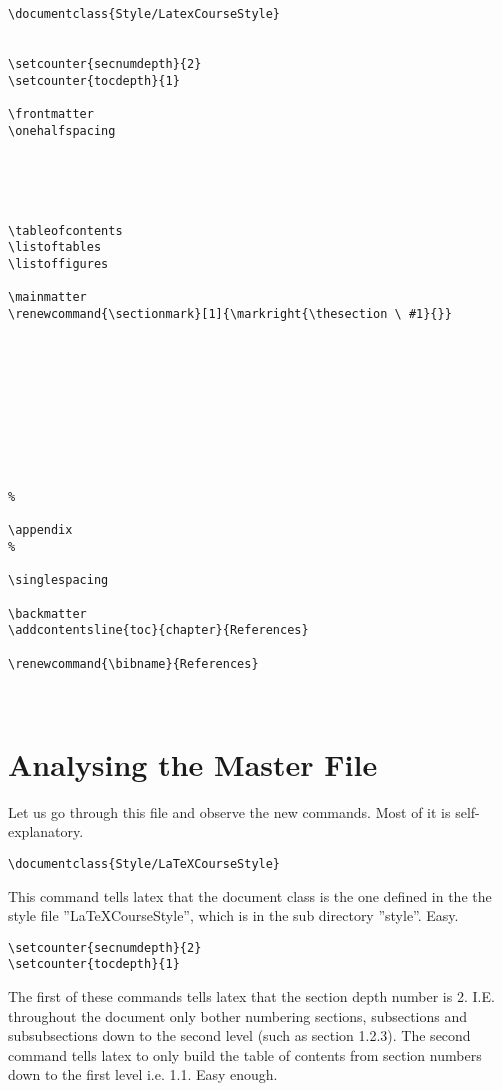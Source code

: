 \singlespacing
\pagebreak
\begin{verbatim}
\documentclass{Style/LatexCourseStyle}


\setcounter{secnumdepth}{2}
\setcounter{tocdepth}{1}

\frontmatter
\onehalfspacing





\tableofcontents
\listoftables
\listoffigures

\mainmatter
\renewcommand{\sectionmark}[1]{\markright{\thesection \ #1}{}}










%

\appendix
%

\singlespacing

\backmatter
\addcontentsline{toc}{chapter}{References}

\renewcommand{\bibname}{References}



\end{verbatim}
\onehalfspacing
\pagebreak

\section{Analysing the Master File}
Let us go through this file and observe the new commands. Most of it is self-explanatory.

\begin{verbatim}
\documentclass{Style/LaTeXCourseStyle}
\end{verbatim}

This command tells latex that the document class is the one defined in the the style file ''LaTeXCourseStyle'', which is in the sub directory ''style''.  Easy.

\begin{verbatim}
\setcounter{secnumdepth}{2}
\setcounter{tocdepth}{1}
\end{verbatim}

The first of these commands tells latex that the section depth number is 2. I.E. throughout the document only bother numbering sections, subsections and subsubsections down to the second level (such as section 1.2.3). The second command tells latex to only build the table of contents from section numbers down to the first level i.e. 1.1.  Easy enough.

